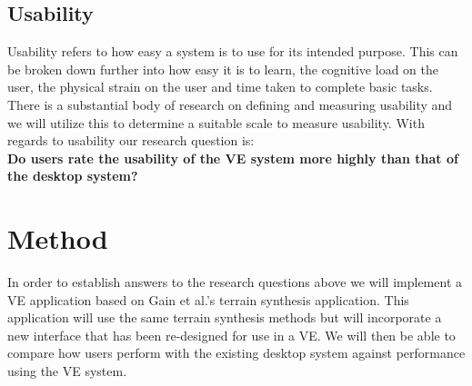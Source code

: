 \documentclass{sig-alternate-05-2015}
\begin{document}
\subsection{Usability}
Usability refers to how easy a system is to use for its intended purpose. This can be broken down further into how easy it is to learn, the cognitive load on the user, the physical strain on the user and time taken to complete basic tasks. There is a substantial body of research on defining and measuring usability and we will utilize this to determine a suitable scale to measure usability. With regards to usability our research question is:\\
\textbf{Do users rate the usability of the VE system more highly than that of the desktop system?}\\ 
	
\section{Method}
In order to establish answers to the research questions above we will implement a VE application based on Gain et al.'s terrain synthesis application\cite{Gain2015}. This application will use the same terrain synthesis methods but will incorporate a new interface that has been re-designed for use in a VE. We will then be able to compare how users perform with the existing desktop system against performance using the VE system.
\end{document}
